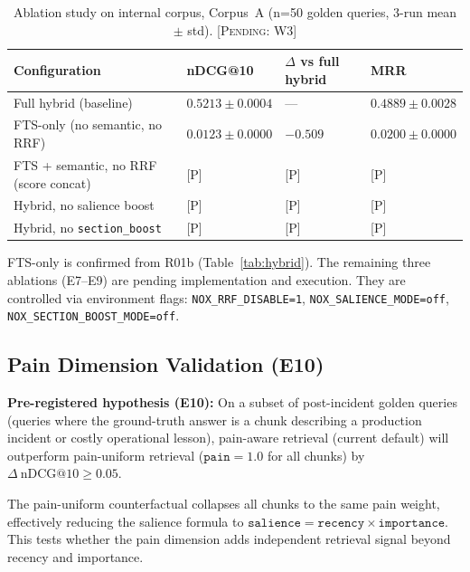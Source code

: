 \documentclass{article}
\begin{document}
\begin{table}[t]
  \caption{Ablation study on internal corpus, Corpus~A
    (n=50 golden queries, 3-run mean $\pm$ std). \textsc{[Pending: W3]}}
  \label{tab:ablation}
  \centering
  \begin{tabular}{llll}
    \toprule
    Configuration & nDCG@10 & $\Delta$ vs full hybrid & MRR \\
    \midrule
    Full hybrid (baseline)                             & $0.5213 \pm 0.0004$ & --- & $0.4889 \pm 0.0028$ \\
    FTS-only (no semantic, no RRF)                     & $0.0123 \pm 0.0000$ & $-0.509$ & $0.0200 \pm 0.0000$ \\
    FTS + semantic, no RRF (score concat)              & {[}P{]} & {[}P{]} & {[}P{]} \\
    Hybrid, no salience boost                          & {[}P{]} & {[}P{]} & {[}P{]} \\
    Hybrid, no \texttt{section\_boost}                 & {[}P{]} & {[}P{]} & {[}P{]} \\
    \bottomrule
  \end{tabular}
  \begin{minipage}{\linewidth}
    \vspace{4pt}
    \footnotesize
    FTS-only is confirmed from R01b (Table~\ref{tab:hybrid}). The remaining three ablations
    (E7--E9) are pending implementation and execution. They are controlled via environment
    flags: \texttt{NOX\_RRF\_DISABLE=1}, \texttt{NOX\_SALIENCE\_MODE=off},
    \texttt{NOX\_SECTION\_BOOST\_MODE=off}.
  \end{minipage}
\end{table}

\subsection{Pain Dimension Validation (E10)}

\textbf{Pre-registered hypothesis (E10):} On a subset of post-incident golden queries
(queries where the ground-truth answer is a chunk describing a production incident or
costly operational lesson), pain-aware retrieval (current default) will outperform
pain-uniform retrieval ($\texttt{pain}=1.0$ for all chunks) by $\Delta~\text{nDCG@10}
\geq 0.05$.

The pain-uniform counterfactual collapses all chunks to the same pain weight, effectively
reducing the salience formula to
$\texttt{salience} = \texttt{recency} \times \texttt{importance}$. This tests whether the
pain dimension adds independent retrieval signal beyond recency and importance.
\end{document}

